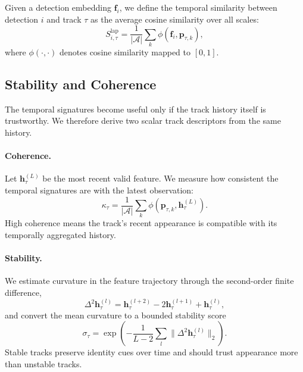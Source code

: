 Given a detection embedding $\mathbf{f}_i$, we define the temporal similarity between detection $i$ and track $\tau$ as the average cosine similarity over all scales:
\begin{equation}
S^{\text{lap}}_{i,\tau}=\frac{1}{|\mathcal{A}|}\sum_{k}\phi(\mathbf{f}_i,\mathbf{p}_{\tau,k}),
\end{equation}
where $\phi(\cdot,\cdot)$ denotes cosine similarity mapped to $[0,1]$.

\subsection{Stability and Coherence}
The temporal signatures become useful only if the track history itself is trustworthy. We therefore derive two scalar track descriptors from the same history.

\paragraph{Coherence.}
Let $\mathbf{h}_{\tau}^{(L)}$ be the most recent valid feature. We measure how consistent the temporal signatures are with the latest observation:
\begin{equation}
\kappa_{\tau}=\frac{1}{|\mathcal{A}|}\sum_{k}\phi(\mathbf{p}_{\tau,k}, \mathbf{h}_{\tau}^{(L)}).
\end{equation}
High coherence means the track's recent appearance is compatible with its temporally aggregated history.

\paragraph{Stability.}
We estimate curvature in the feature trajectory through the second-order finite difference,
\begin{equation}
\Delta^2 \mathbf{h}_{\tau}^{(l)} = \mathbf{h}_{\tau}^{(l+2)} - 2\mathbf{h}_{\tau}^{(l+1)} + \mathbf{h}_{\tau}^{(l)},
\end{equation}
and convert the mean curvature to a bounded stability score
\begin{equation}
\sigma_{\tau}=\exp\!\left(-\frac{1}{L-2}\sum_l \|\Delta^2 \mathbf{h}_{\tau}^{(l)}\|_2\right).
\end{equation}
Stable tracks preserve identity cues over time and should trust appearance more than unstable tracks.

